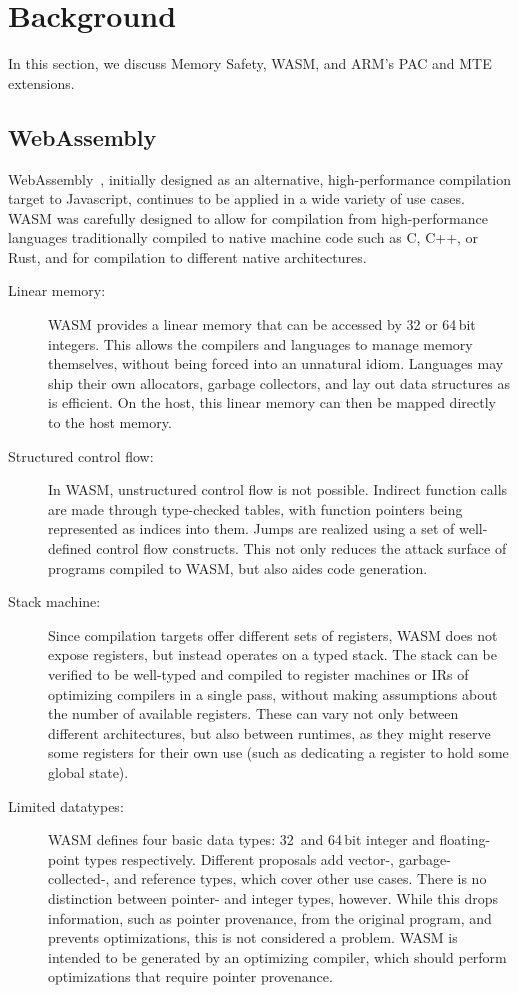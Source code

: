 \chapter{Background}
\label{ch:background}

In this section, we discuss Memory Safety, \ac{WASM}, and ARM's \ac{PAC} and \ac{MTE} extensions.

\section{WebAssembly}
\label{sec:wasm}

WebAssembly~\cite{haas2017bringing}, initially designed as an alternative, high-performance compilation target to Javascript, continues to be applied in a wide variety of use cases.
\Ac{WASM} was carefully designed to allow for compilation from high-performance languages traditionally compiled to native machine code such as C, C++, or Rust, and for compilation to different native architectures.
\begin{description}
    \item[Linear memory:] \Ac{WASM} provides a linear memory that can be accessed by 32 or 64\,bit integers.
    This allows the compilers and languages to manage memory themselves, without being forced into an unnatural idiom.
    Languages may ship their own allocators, garbage collectors, and lay out data structures as is efficient.
    On the host, this linear memory can then be mapped directly to the host memory.
    \item[Structured control flow:] In \ac{WASM}, unstructured control flow is not possible.
    Indirect function calls are made through type-checked tables, with function pointers being represented as indices into them.
    Jumps are realized using a set of well-defined control flow constructs.
    This not only reduces the attack surface of programs compiled to \ac{WASM}, but also aides code generation. 
    \item[Stack machine:] Since compilation targets offer different sets of registers, \ac{WASM} does not expose registers, but instead operates on a typed stack.
    The stack can be verified to be well-typed and compiled to register machines or \acp{IR} of optimizing compilers in a single pass, without making assumptions about the number of available registers.
    These can vary not only between different architectures, but also between runtimes, as they might reserve some registers for their own use (such as dedicating a register to hold some global state).
    \item[Limited datatypes:] \Ac{WASM} defines four basic data types: 32\, and 64\,bit integer and floating-point types respectively.
    Different proposals add \mbox{vector-}, \mbox{garbage-collected-}, and reference types, which cover other use cases.
    There is no distinction between pointer- and integer types, however.
    While this drops information, such as pointer provenance, from the original program, and prevents optimizations, this is not considered a problem.
    \Ac{WASM} is intended to be generated by an optimizing compiler, which should perform optimizations that require pointer provenance.
\end{description}

